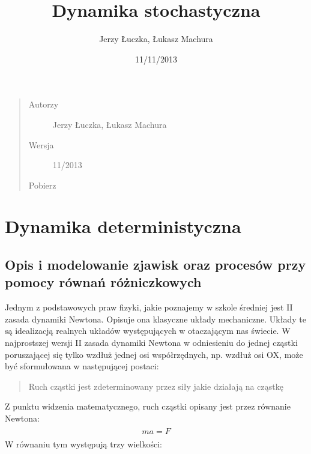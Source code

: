 \documentclass[a4paper,12pt,polish]{sphinxmanual}
\title{Dynamika stochastyczna}
\date{11/11/2013}
\author{Jerzy Łuczka, Łukasz Machura}
\begin{document}
\maketitle
\tableofcontents
{}\label{index::doc}

\begin{quote}\begin{description}
\item[{Autorzy}] \leavevmode
Jerzy Łuczka,
Łukasz Machura

\item[{Wersja}]  11/2013

\item[{Pobierz}] \leavevmode
{}

\end{description}\end{quote}


\chapter{Dynamika deterministyczna}
\label{index:dynamika-stochastyczna}\label{index:dynamika-deterministyczna}

\section{Opis i modelowanie zjawisk oraz procesów przy pomocy równań różniczkowych}
\label{ch1/chI011:opis-i-modelowanie-zjawisk-oraz-procesow-przy-pomocy-rownan-rozniczkowych}\label{ch1/chI011::doc}
Jednym z podstawowych praw fizyki, jakie poznajemy w szkole średniej jest II zasada dynamiki Newtona. Opisuje ona klasyczne układy mechaniczne. Układy te są idealizacją realnych układów występujących w otaczającym nas świecie. W najprostszej wersji II zasada dynamiki Newtona w odniesieniu do jednej cząstki poruszającej się tylko wzdłuż jednej osi współrzędnych, np. wzdłuż osi OX, może być sformułowana w następującej postaci:
\begin{quote}

Ruch cząstki jest zdeterminowany przez siły jakie działają na cząstkę
\end{quote}

Z punktu widzenia matematycznego, ruch cząstki opisany jest przez równanie Newtona:
\label{ch1/chI011:equation-eqn1}\begin{gather}
\begin{split}m a = F\end{split}\label{ch1/chI011-eqn1}
\end{gather}
W równaniu tym występują trzy wielkości:
\end{document}
